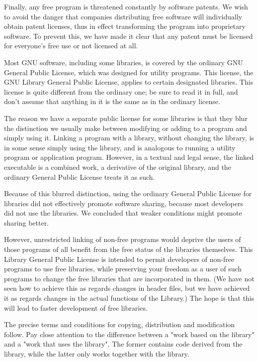 Finally, any free program is threatened constantly by software patents. We wish to avoid the danger that companies distributing free software will individually obtain patent licenses, thus in effect transforming the program into proprietary software. To prevent this, we have made it clear that any patent must be licensed for everyone's free use or not licensed at all. 

Most GNU software, including some libraries, is covered by the ordinary GNU General Public License, which was designed for utility programs. This license, the GNU Library General Public License, applies to certain designated libraries. This license is quite different from the ordinary one; be sure to read it in full, and don't assume that anything in it is the same as in the ordinary license. 

The reason we have a separate public license for some libraries is that they blur the distinction we usually make between modifying or adding to a program and simply using it. Linking a program with a library, without changing the library, is in some sense simply using the library, and is analogous to running a utility program or application program. However, in a textual and legal sense, the linked executable is a combined work, a derivative of the original library, and the ordinary General Public License treats it as such. 

Because of this blurred distinction, using the ordinary General Public License for libraries did not effectively promote software sharing, because most developers did not use the libraries. We concluded that weaker conditions might promote sharing better. 

However, unrestricted linking of non-free programs would deprive the users of those programs of all benefit from the free status of the libraries themselves. This Library General Public License is intended to permit developers of non-free programs to use free libraries, while preserving your freedom as a user of such programs to change the free libraries that are incorporated in them. (We have not seen how to achieve this as regards changes in header files, but we have achieved it as regards changes in the actual functions of the Library.) The hope is that this will lead to faster development of free libraries. 

The precise terms and conditions for copying, distribution and modification follow. Pay close attention to the difference between a "work based on the library" and a "work that uses the library". The former contains code derived from the library, while the latter only works together with the library. 

